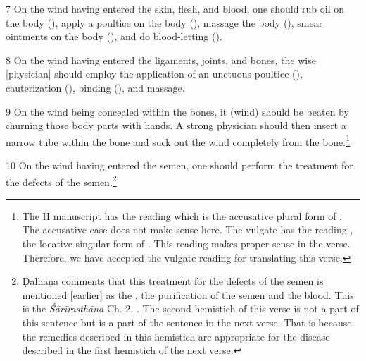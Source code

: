 \begin{translation}
    \item [7]
    On the wind having entered the skin, flesh, and blood, one should rub oil on the body (), apply a poultice on the body (), massage the body (), smear ointments on the body (), and do blood-letting (). 

    \item[8]
    On the wind having entered the ligaments, joints, and bones, the wise [physician] should employ the application of an unctuous poultice (), cauterization (), binding (), and massage.

    \item [9]
    On the wind being concealed within the bones, it (wind) should be beaten by churning those body parts with hands. A strong physician should then insert a narrow tube within the bone and suck out the wind completely from the bone.\footnote{The H manuscript has the reading  which is the accusative plural form of . The accusative case does not make sense here.  The vulgate has the reading , the locative singular form of . This reading makes proper sense in the verse. Therefore, we have accepted the vulgate reading  for translating this verse.} 

    \item[10]
    On the wind having entered the semen, one should perform the treatment for the defects of the semen.\footnote{Ḍalhaṇa comments \citep[421]{vulgate} that this treatment for the defects of the semen is mentioned [earlier] as the , the purification of the semen and the blood. This is the \emph{Śārīrasthāna} Ch. 2, . The second hemistich of this verse is not a part of this sentence but is a part of the sentence in the next verse. That is because the remedies described in this hemistich are appropriate for the disease described in the first hemistich of the next verse.}


\end{translation}
